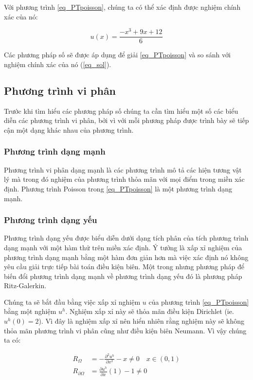 Với phương trình \cref{eq_PTpoisson}, chúng ta có thể xác định được nghiệm chính xác của nó:

\begin{equation}\label{eq_sol}
    u\left(x\right) = \frac{-x^3 + 9x + 12}{6}
\end{equation}

Các phương pháp số sẽ được áp dụng để giải \cref{eq_PTpoisson} và so sánh với nghiệm chính xác của nó (\cref{eq_sol}).

\subsection{Phương trình vi phân}

Trước khi tìm hiểu các phương pháp số chúng ta cần tìm hiểu một số các biểu diễn các phương trình vi phân, bởi vì với mỗi phương pháp được trình bày sẽ tiếp cận một dạng khác nhau của phương trình.

\subsubsection{Phương trình dạng mạnh}

Phương trình vi phân dạng mạnh là các phương trình mô tả các hiện tương vật lý mà trong đó nghiệm của phương trình thỏa mãn với mọi điểm trong miền xác định. Phương trình Poisson trong \cref{eq_PTpoisson} là một phương trình dạng mạnh. 

\subsubsection{Phương trình dạng yếu}

Phương trình dạng yếu được biểu diễn dưới dạng tích phân của tích phương trình dạng mạnh với một hàm thử trên miền xác định. Ý tưởng là xấp xỉ nghiệm của phương trình dạng mạnh bằng một hàm đơn giản hơn mà việc xác định nó không yêu cầu giải trực tiếp bài toán điều kiện biên. Một trong nhưng phương pháp để biến đổi phương trình dạng mạnh về phương trình dạng yếu đó là phương pháp Ritz-Galerkin.

Chúng ta sẽ bắt đầu bằng việc xấp xỉ nghiệm $u$ của phương trình \cref{eq_PTpoisson} bằng một nghiệm $u^h$. Nghiệm xấp xỉ này sẽ thỏa mãn điều kiện Dirichlet (ie. $u^h(0) = 2$). Vì đây là nghiệm xấp xỉ nên hiển nhiên rằng nghiệm này sẽ không thỏa mãn phương trình vi phân cũng như điều kiện biên Neumann. Vì vậy chúng ta có:

\begin{equation}\label{eq_RR}
    \begin{aligned}
        R_{\Omega} &= -\frac{\partial^2 u^h}{\partial x^2} - x \neq 0 \quad x \in \left(0, 1\right) \\
        R_{\partial\Omega} &= \frac{\partial u^h}{\partial x} \left(1\right) - 1 \neq 0 \\
    \end{aligned}
\end{equation}

